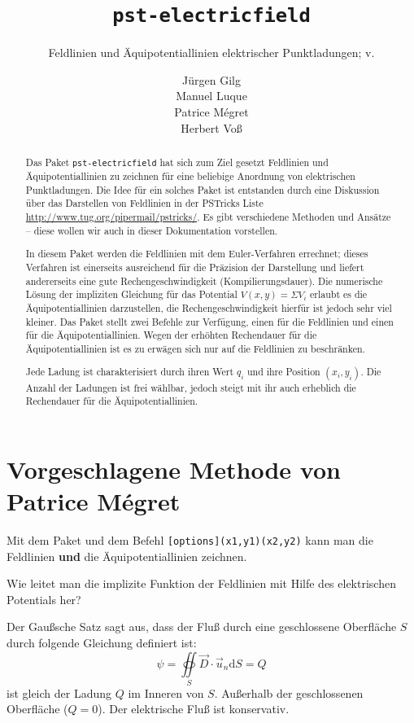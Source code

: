 \documentclass[11pt,english,ngerman,BCOR10mm,DIV12,bibliography=totoc,parskip=false,smallheadings
    headexclude,footexclude,oneside]{pst-doc}
\title{\texttt{pst-electricfield}}
\subtitle{Feldlinien und \"{A}quipotentiallinien elektrischer Punktladungen; v.\pstEFfv}
\author{J\"{u}rgen Gilg\\ Manuel Luque\\ Patrice M\'egret\\ Herbert Vo\ss}
\begin{document}
\maketitle
\begin{abstract}
Das Paket \texttt{pst-electricfield} hat sich zum Ziel gesetzt Feldlinien und \"{A}quipotentiallinien 
zu zeichnen f\"{u}r eine beliebige  Anordnung von elektrischen Punktladungen. Die Idee f\"{u}r ein 
solches Paket ist entstanden durch eine Diskussion \"{u}ber das Darstellen von Feldlinien in der 
PSTricks Liste \url{http://www.tug.org/pipermail/pstricks/}. Es gibt verschiedene Methoden und 
Ans\"{a}tze -- diese wollen wir auch in dieser Dokumentation vorstellen.

In diesem Paket werden die Feldlinien mit dem Euler-Verfahren errechnet; dieses Verfahren ist 
einerseits ausreichend f\"{u}r die Pr\"{a}zision der Darstellung und liefert andererseits eine gute 
Rechengeschwindigkeit (Kompilierungsdauer). Die numerische L\"{o}sung der impliziten Gleichung 
f\"{u}r das Potential $V(x,y)=\Sigma V_i$ erlaubt es die \"{A}quipotentiallinien darzustellen, 
die Rechengeschwindigkeit hierf\"{u}r ist jedoch sehr viel kleiner. Das Paket stellt zwei Befehle 
zur Verf\"{u}gung, einen f\"{u}r die Feldlinien und einen f\"{u}r die \"{A}quipotentiallinien. 
Wegen der erh\"{o}hten Rechendauer f\"{u}r die \"{A}quipotentiallinien ist es zu erw\"{a}gen sich 
nur auf die Feldlinien zu beschr\"{a}nken.

Jede Ladung ist charakterisiert durch ihren Wert $q_i$ und ihre Position $(x_i,y_i)$. Die Anzahl 
der Ladungen ist frei w\"{a}hlbar, jedoch steigt mit ihr auch erheblich die Rechendauer f\"{u}r 
die \"{A}quipotentiallinien.
\end{abstract}

\section{Vorgeschlagene Methode von Patrice M\'egret}

Mit dem Paket  und dem Befehl \verb+[options](x1,y1)(x2,y2)+
kann man die Feldlinien \textbf{und} die \"{A}quipotentiallinien zeichnen.

Wie leitet man die implizite Funktion der Feldlinien mit Hilfe des elektrischen Potentials her?

Der Gau{\ss}sche Satz sagt aus, dass der Flu{\ss} durch eine geschlossene Oberfl\"{a}che $S$ 
durch folgende Gleichung definiert ist:
\begin{equation}\label{pm-eq-a}
\psi = \oiint\limits_S \vec{D} \cdot \vec{u}_n \mathrm{d} S = Q
\end{equation}
ist gleich der Ladung $Q$ im Inneren von $S$. Au{\ss}erhalb der geschlossenen Oberfl\"{a}che ($Q=0$). 
Der elektrische Flu{\ss} ist konservativ.
\end{document}
